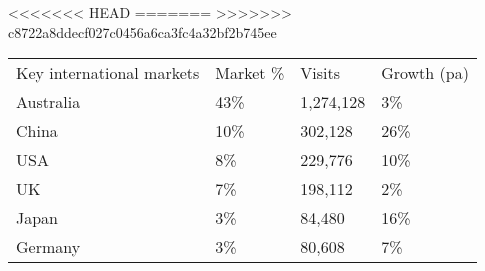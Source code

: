<<<<<<< HEAD
=======
>>>>>>> c8722a8ddecf027c0456a6ca3fc4a32bf2b745ee
\begin{tabular}[t]{p{3.3cm}>{\hfill}p{1.1cm}>{\hfill}p{1.3cm}>{\hfill}p{1.4cm}}
 Key international markets & Market \% & Visits & Growth (pa) \\ 
 Australia & 43\% & 1,274,128 & 3\% \\ 
  China & 10\% &   302,128 & 26\% \\ 
  USA & 8\% &   229,776 & 10\% \\ 
  UK & 7\% &   198,112 & 2\% \\ 
  Japan & 3\% &    84,480 & 16\% \\ 
  Germany & 3\% &    80,608 & 7\% \\ 
  \end{tabular}
